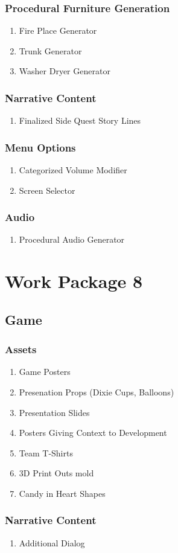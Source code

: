 \subsubsection{Procedural Furniture Generation}
\begin{enumerate}
\item Fire Place Generator
\item Trunk Generator
\item Washer Dryer Generator
\end{enumerate}
\subsubsection{Narrative Content}
\begin{enumerate}
\item Finalized Side Quest Story Lines
\end{enumerate}
\subsubsection{Menu Options}
\begin{enumerate}
\item Categorized Volume Modifier
\item Screen Selector
\end{enumerate}
\subsubsection{Audio}
\begin{enumerate}
\item Procedural Audio Generator
\end{enumerate}


\section{Work Package 8}
\subsection{Game}
\subsubsection{Assets}
\begin{enumerate}
\item Game Posters
\item Presenation Props (Dixie Cups, Balloons)
\item Presentation Slides
\item Posters Giving Context to Development
\item Team T-Shirts
\item 3D Print Outs mold
\item Candy in Heart Shapes
\end{enumerate}
\subsubsection{Narrative Content}
\begin{enumerate}
\item Additional Dialog
\end{enumerate}